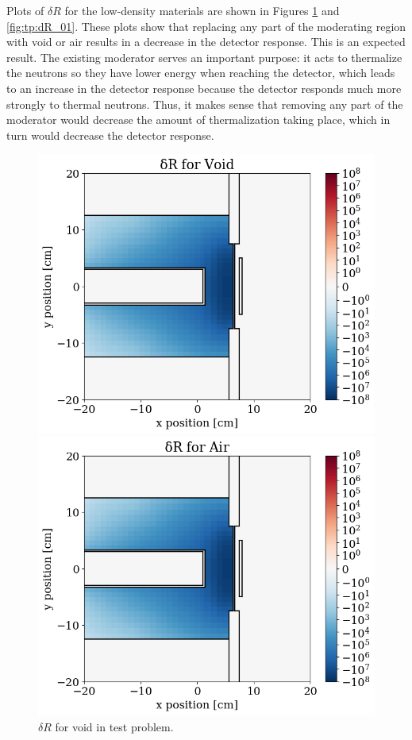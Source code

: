 Plots of $\delta R$ for the low-density materials are shown in Figures \ref{fig:tp:dR_00} and \ref{fig:tp:dR_01}.
These plots show that replacing any part of the moderating region with void or air results in a decrease in the detector response.
This is an expected result.
The existing moderator serves an important purpose: it acts to thermalize the neutrons so they have lower energy when reaching the detector, which leads to an increase in the detector response because the detector responds much more strongly to thermal neutrons.
Thus, it makes sense that removing any part of the moderator would decrease the amount of thermalization taking place, which in turn would decrease the detector response.

\begin{figure}
  \begin{minipage}{0.495\linewidth}
    \centering
    \includegraphics[width=\linewidth]{content/testprob/dR_00.png}
    \caption{$\delta R$ for void in test problem.}
    \label{fig:tp:dR_00}
  \end{minipage}
  \hfill
  \begin{minipage}{0.495\linewidth}
    \centering
    \includegraphics[width=\linewidth]{content/testprob/dR_01.png}

\end{minipage}
\end{figure}
